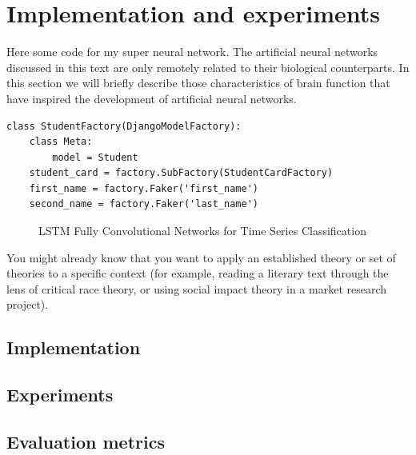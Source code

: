 \chapter{Implementation and experiments}
\label{sec:imp}

Here some code for my super neural network. 
The artificial neural networks discussed in this text are only remotely related to their biological counterparts. In this section we will briefly describe those characteristics of brain function that have inspired the development of artificial neural networks.

 
\begin{lstlisting}[caption={StudentFactory},captionpos=b]
class StudentFactory(DjangoModelFactory):
	class Meta:
		model = Student
	student_card = factory.SubFactory(StudentCardFactory)
	first_name = factory.Faker('first_name')
	second_name = factory.Faker('last_name')
\end{lstlisting}

\begin{figure}
	\caption{LSTM Fully Convolutional Networks for Time Series Classification}
	\label{fig:nn1}
\end{figure}

You might already know that you want to apply an established theory or set of theories to a specific context (for example, reading a literary text through the lens of critical race theory, or using social impact theory in a market research project). 

\section{Implementation}
\label{sec:imp:programming}

\section{Experiments}
\label{sec:imp:experiments}


\section{Evaluation metrics}
\label{sec:imp:eval}


